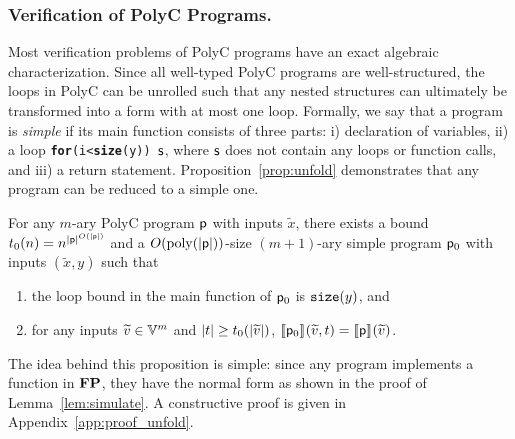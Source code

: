 \documentclass[runningheads]{llncs}
\begin{document}
\subsubsection{Verification of PolyC Programs.}
Most verification problems of PolyC programs have an exact algebraic characterization.
Since all well-typed PolyC programs are well-structured, the loops in PolyC can be unrolled such that any nested structures can ultimately be transformed into a form with at most one loop. 
Formally, we say that a program is \emph{simple} if its main function consists of three parts: i) declaration of variables, ii) a loop \texttt{\textbf{for}(i<\textbf{size}(y)) $\mathsf{s}$}, where $\mathsf{s}$ does not contain any loops or function calls, and iii) a return statement.
Proposition~\ref{prop:unfold} demonstrates that any program can be reduced to a simple one.

\begin{proposition}
    \label{prop:unfold}
    For any $m$-ary PolyC program $\mathsf{p}$ with inputs $\widetilde{x}$, there exists a bound $t_0(n)=n^{\vert\mathsf{p}\vert^{O(\vert\mathsf{p}\vert)}}$ and a $O(\mathrm{poly}(\vert\mathsf{p}\vert))$-size $(m+1)$-ary simple program $\mathsf{p}_0$ with inputs $(\widetilde{x},y)$ such that
    \begin{enumerate}
        \item the loop bound in the main function of $\mathsf{p}_0$ is $\mathtt{size}(y)$, and
        \item for any inputs $\widetilde{v}\in\mathbb{V}^m$ and $\vert t\vert\ge t_0(\vert\widetilde{v}\vert)$, $\llbracket\mathsf{p}_0\rrbracket_{}(\widetilde{v},t)=\llbracket\mathsf{p}\rrbracket_{}(\widetilde{v})$.
    \end{enumerate}
\end{proposition}
The idea behind this proposition is simple: since any program implements a function in $\mathbf{FP}$, they have the normal form as shown in the proof of Lemma~\ref{lem:simulate}.
A constructive proof is given in Appendix~\ref{app:proof_unfold}.
\end{document}
